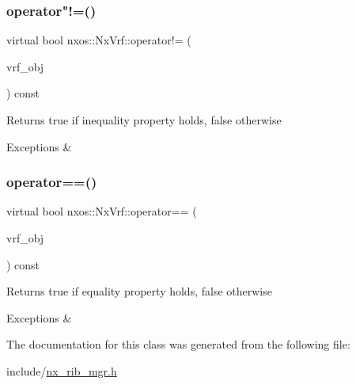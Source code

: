 \subsubsection{\texorpdfstring{operator"!=()}{operator!=()}}
{\footnotesize\ttfamily virtual bool nxos\+::\+Nx\+Vrf\+::operator!= (\begin{DoxyParamCaption}\item[{\mbox{\hyperlink{classnxos_1_1_nx_vrf}{Nx\+Vrf}} const \&}]{vrf\+\_\+obj }\end{DoxyParamCaption}) const\hspace{0.3cm}{\ttfamily [pure virtual]}}

\begin{DoxyReturn}{Returns}
true if inequality property holds, false otherwise
\end{DoxyReturn}

\begin{DoxyCode}
\end{DoxyCode}



\begin{DoxyExceptions}{Exceptions}
{\em } & \\
\hline
\end{DoxyExceptions}
\mbox{\label{classnxos_1_1_nx_vrf_adc5d2e97b5fceb4fab75c448fb54ada5}} 
\subsubsection{\texorpdfstring{operator==()}{operator==()}}
{\footnotesize\ttfamily virtual bool nxos\+::\+Nx\+Vrf\+::operator== (\begin{DoxyParamCaption}\item[{\mbox{\hyperlink{classnxos_1_1_nx_vrf}{Nx\+Vrf}} const \&}]{vrf\+\_\+obj }\end{DoxyParamCaption}) const\hspace{0.3cm}{\ttfamily [pure virtual]}}

\begin{DoxyReturn}{Returns}
true if equality property holds, false otherwise
\end{DoxyReturn}

\begin{DoxyCode}
\end{DoxyCode}



\begin{DoxyExceptions}{Exceptions}
{\em } & \\
\hline
\end{DoxyExceptions}


The documentation for this class was generated from the following file\+:\begin{DoxyCompactItemize}
\item 
include/\mbox{\hyperlink{nx__rib__mgr_8h}{nx\+\_\+rib\+\_\+mgr.\+h}}\end{DoxyCompactItemize}
